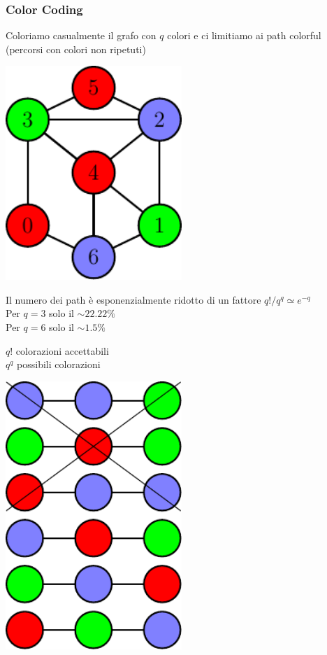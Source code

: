\begin{frame}
	\frametitle{Color Coding}
	\centering

	\pause

		\begin{minipage}{.45\textwidth}
			\centering
			Coloriamo casualmente il grafo con $q$ colori e ci limitiamo ai path colorful 
			(percorsi con colori non ripetuti)
			\medskip
			
			\includegraphics[width=0.5\textwidth]{images/8_cc_graph}
			
			\small
			\medskip
			
			Il numero dei path è esponenzialmente ridotto di un fattore $q! / q^q \simeq e^{-q}$\\
			 
			Per $q=3$ solo il $\sim22.22\%$\\
			Per $q=6$ solo il $\sim1.5\%$\phantom{$22$}
		\end{minipage}\hfill
		\pause
		\begin{minipage}{.45\textwidth}
			\centering
			
			\small
			
			$q!$ colorazioni accettabili\\
			$q^q$ possibili colorazioni
			
			\medskip
			
			\includegraphics[width=0.5\textwidth]{images/8_cc_list}
			

\end{minipage}
\end{frame}
